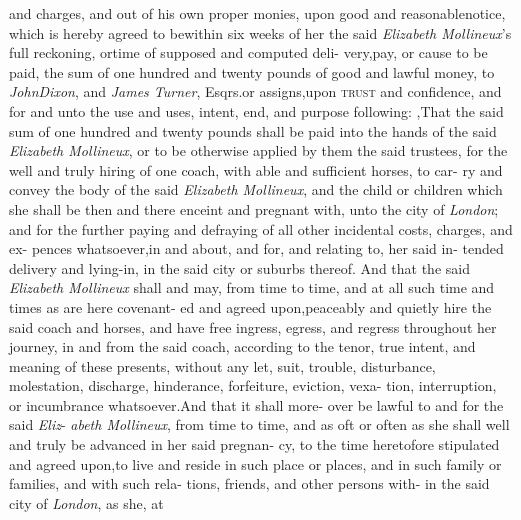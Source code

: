 \documentclass{article}
\begin{document}
\begin{story}{}
and charges, and out of his own proper monies, upon good and reasonable\break notice,
which is hereby agreed to be\pb within six weeks of her the said \textit{Elizabeth
Mollineux}’s full reckoning, or\break time of supposed and computed
deli-\break 
    very,\tsk  pay, or cause to be paid, the\break
    sum of one hundred and twenty pounds\break
    of good and lawful money, to \textit{John}\break\textit{Dixon}, and \textit{James Turner},
Esqrs.\@ or assigns,\tsk  upon \textsc{trust} and confidence, and for and
unto the use and uses, intent, end, and purpose following:\tsk\break
{},\tsk  That the said sum of one hundred and twenty pounds shall be paid
into the hands of the said \textit{Elizabeth Mollineux}, or to be otherwise
applied by them the said trustees, for the well and truly hiring of one coach,
with able and sufficient horses, to car-\break 
    ry and convey the body of the said\break
\textit{Elizabeth Mollineux}, and the child or children which she shall be then
and there enceint and pregnant with,\tsk\pb  
    unto the city of \textit{London}; and for the\break
    further paying and defraying of all\break
    other incidental costs, charges, and ex-\break
    pences whatsoever,\tsk  in and about,\break
    and for, and relating to, her said in-\break
    tended delivery and lying-in, in the\break
    said city or suburbs thereof. And that\break
    the said \textit{Elizabeth Mollineux} shall and\break
    may, from time to time, and at all such\break
    time and times as are here covenant-\break
    ed and agreed upon,\tsk  peaceably and\break
    quietly hire the said coach and horses,\break
    and have free ingress, egress, and\break
    regress throughout her journey, in and\break
    from the said coach, according to the\break
    tenor, true intent, and meaning of these\break
    presents, without any let, suit, trouble,\break
    disturbance, molestation, discharge,\break
    hinderance, forfeiture, eviction, vexa-\break
    tion, interruption, or incumbrance\break
    whatsoever.\tsk  And that it shall more-\pb 
    over be lawful to and for the said \textit{Eliz}-\break
    \textit{abeth Mollineux}, from time to time,\break
    and as oft or often as she shall well and\break
    truly be advanced in her said pregnan-\break
    cy, to the time heretofore stipulated\break
    and agreed upon,\tsk  to live and reside\break
    in such place or places, and in such\break
    family or families, and with such rela-\break
    tions, friends, and other persons with-\break
    in the said city of \textit{London}, as she, at\break

\end{story}
\end{document}
